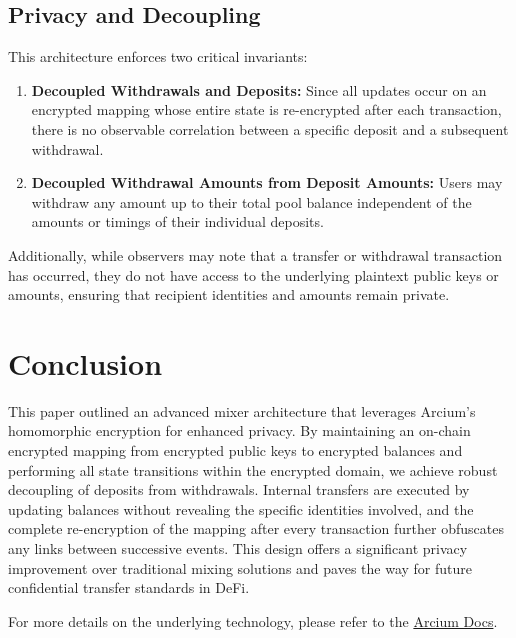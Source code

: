 \documentclass[11pt]{article}
\begin{document}
\subsection{Privacy and Decoupling}
This architecture enforces two critical invariants:
\begin{enumerate}
    \item \textbf{Decoupled Withdrawals and Deposits:} Since all updates occur on an encrypted mapping whose entire state is re-encrypted after each transaction, there is no observable correlation between a specific deposit and a subsequent withdrawal.
    \item \textbf{Decoupled Withdrawal Amounts from Deposit Amounts:} Users may withdraw any amount up to their total pool balance independent of the amounts or timings of their individual deposits.
\end{enumerate}
Additionally, while observers may note that a transfer or withdrawal transaction has occurred, they do not have access to the underlying plaintext public keys or amounts, ensuring that recipient identities and amounts remain private.

\section{Conclusion}
This paper outlined an advanced mixer architecture that leverages Arcium's homomorphic encryption for enhanced privacy. By maintaining an on-chain encrypted mapping from encrypted public keys to encrypted balances and performing all state transitions within the encrypted domain, we achieve robust decoupling of deposits from withdrawals. Internal transfers are executed by updating balances without revealing the specific identities involved, and the complete re-encryption of the mapping after every transaction further obfuscates any links between successive events. This design offers a significant privacy improvement over traditional mixing solutions and paves the way for future confidential transfer standards in DeFi. 

For more details on the underlying technology, please refer to the \href{https://docs.arcium.com/}{Arcium Docs}.
\end{document}
